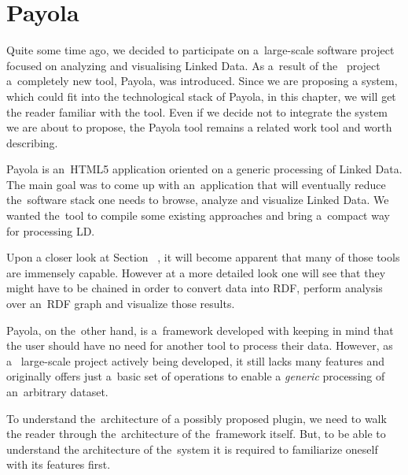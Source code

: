 \chapter{Payola}
\label{ch:payola}

Quite some time ago, we decided to participate on a~large-scale software 
project focused on analyzing and visualising Linked Data. As a~result of the~
project a~completely new tool, Payola, was introduced. Since we are proposing a 
system, which could fit into the technological stack of Payola, in this chapter, 
we will get the reader familiar with the tool. Even if we  decide 
not to integrate the system we are about to propose, the Payola tool remains
a related work tool and worth describing.

Payola is an~HTML5 application oriented on a generic processing of Linked Data. 
The main goal was to come up with an~application that will eventually reduce the~software 
stack one needs to browse, analyze and visualize Linked Data. We wanted the~tool 
to compile some existing approaches and bring a~compact way for processing LD.

Upon a closer look at Section ~\cite{chap:rw}, it will become apparent that many of those tools are
immensely capable. However at a more detailed look one will see that they might have to
be chained in order to convert data into 
RDF, perform analysis over an~RDF graph and visualize those results.

Payola, on the~other hand, is a~framework developed with keeping in mind that 
the user should have no need for another tool to process their data. However, as a~
large-scale project actively being developed, it still lacks many 
features and originally offers just a~basic set of operations to enable a
\emph{generic} processing of an~arbitrary dataset.

To understand the~architecture of a possibly proposed plugin, we need to walk the reader 
through the~architecture of the~framework itself. But, to be able to understand 
the architecture of the~system it is required to familiarize oneself with its features first.

